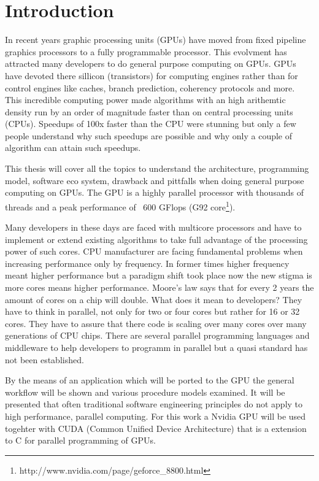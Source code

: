 \label{ch:interim_report}
\section*{Introduction} 
\label{sub:introduction} 

In recent years graphic processing units (GPUs) have moved from fixed pipeline
graphics processors to a fully programmable processor. This evolvment has
attracted many developers to do general purpose computing on GPUs. GPUs have
devoted there sillicon (transistors) for computing engines rather than for
control engines like caches, branch prediction, coherency protocols and more.
This incredible computing power made algorithms with an high arithemtic density
run by an order of magnitude faster than on central processing units (CPUs).
Speedups of 100x faster than the CPU were stunning but only a few people
understand why such speedups are possible and why only a couple of algorithm can
attain such speedups.

This thesis will cover all the topics to understand the architecture,
programming model, software eco system, drawback and pittfalls when doing
general purpose computing on GPUs. The \gls{GPU} is a highly parallel processor with
thousands of threads and a peak performance of ~600 GFlops (G92
core\footnote{http://www.nvidia.com/page/geforce\_8800.html}).

Many developers in these days are faced with multicore processors and have to
implement or extend existing algorithms to take full advantage of the
processing power of such cores. CPU manufacturer are facing fundamental problems
when increasing performance only by frequency. In former times higher frequency
meant higher performance but a paradigm shift took place now the new stigma is
more cores means higher performance. Moore's law says that for every 2 years the
amount of cores on a chip will double. What does it mean to developers? They
have to think in parallel, not only for two or four cores but rather for 16 or
32 cores. They have to assure that there code is scaling over many cores over
many generations of CPU chips. There are several parallel programming languages
and middleware to help developers to programm in parallel but a quasi standard
has not been established.

By the means of an application which will be ported to the \gls{GPU} the general
workflow will be shown and various procedure models examined. It will be
presented that often traditional software engineering principles do not
apply to high performance, parallel computing. For this work a Nvidia \gls{GPU} will
be used togehter with CUDA (Common Unified Device Architecture) that is a
extension to C for parallel programming of GPUs. 


